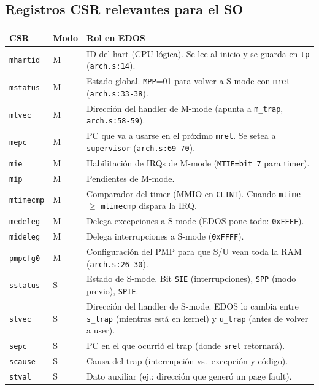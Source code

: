 \documentclass[11pt,a4paper]{article}
\begin{document}
\subsection{Registros CSR relevantes para el SO}

\begin{center}
\small
\begin{longtable}{@{}llp{9.5cm}@{}}
\toprule
CSR & Modo & Rol en EDOS \\
\midrule
\texttt{mhartid} & M & ID del hart (CPU lógica). Se lee al inicio y se guarda en \texttt{tp} (\texttt{arch.s:14}). \\
\texttt{mstatus} & M & Estado global. \texttt{MPP}=01 para volver a S-mode con \texttt{mret} (\texttt{arch.s:33-38}). \\
\texttt{mtvec}   & M & Dirección del handler de M-mode (apunta a \texttt{m\_trap}, \texttt{arch.s:58-59}). \\
\texttt{mepc}    & M & PC que va a usarse en el próximo \texttt{mret}. Se setea a \texttt{supervisor} (\texttt{arch.s:69-70}). \\
\texttt{mie}     & M & Habilitación de IRQs de M-mode (\texttt{MTIE=bit 7} para timer). \\
\texttt{mip}     & M & Pendientes de M-mode. \\
\texttt{mtimecmp}& M & Comparador del timer (MMIO en \texttt{CLINT}). Cuando \texttt{mtime} $\geq$ \texttt{mtimecmp} dispara la IRQ. \\
\texttt{medeleg} & M & Delega excepciones a S-mode (EDOS pone todo: \texttt{0xFFFF}). \\
\texttt{mideleg} & M & Delega interrupciones a S-mode (\texttt{0xFFFF}). \\
\texttt{pmpcfg0} & M & Configuración del PMP para que S/U vean toda la RAM (\texttt{arch.s:26-30}). \\
\midrule
\texttt{sstatus} & S & Estado de S-mode. Bit \texttt{SIE} (interrupciones), \texttt{SPP} (modo previo), \texttt{SPIE}. \\
\texttt{stvec}   & S & Dirección del handler de S-mode. EDOS lo cambia entre \texttt{s\_trap} (mientras está en kernel) y \texttt{u\_trap} (antes de volver a user). \\
\texttt{sepc}    & S & PC en el que ocurrió el trap (donde \texttt{sret} retornará). \\
\texttt{scause}  & S & Causa del trap (interrupción vs.\ excepción y código). \\
\texttt{stval}   & S & Dato auxiliar (ej.: dirección que generó un page fault). \\

\end{longtable}
\end{center}
\end{document}
